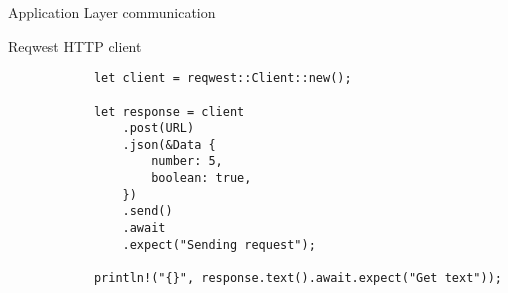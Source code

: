 \begin{frame}[fragile]{Application Layer communication}
    \begin{block}{Reqwest HTTP client}
        \begin{verbatim}
            let client = reqwest::Client::new();

            let response = client
                .post(URL)
                .json(&Data {
                    number: 5,
                    boolean: true,
                })
                .send()
                .await
                .expect("Sending request");

            println!("{}", response.text().await.expect("Get text"));
        \end{verbatim}
    \end{block}

\end{frame}
